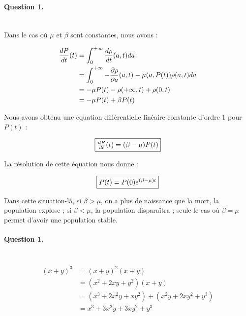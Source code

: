 \documentclass[paper=a4, french]{scrartcl} %
\numberwithin{equation}{section} %
\numberwithin{figure}{section} %
\numberwithin{table}{section} %
\begin{document}

\paragraph{\textbf{Question 1.}}
~\\

Dans le cas où $\mu$ et $\beta$ sont constantes, nous avons :

\begin{equation*}
\begin{aligned}
{dP \over dt}(t)  & =  {\int_{0}^{+\infty}{d\rho \over dt}(a,t)da} \\
& =  {\int_{0}^{+\infty} - \frac{\partial \rho}{\partial a}(a,t) - \mu(a,P(t))\rho(a,t) da} \\
& =  -\mu P(t) - \rho (+ \infty,t) + \rho (0,t) \\
& = -\mu P(t) + \beta P(t) \\
\end{aligned}
\end{equation*}

Nous avons obtenu une équation différentielle linéaire constante d\rq{}ordre 1 pour $P(t)$ :

\begin{equation}
\fbox{${dP \over dt}(t) = (\beta - \mu)P(t)$}
\end{equation}

La résolution de cette équation nous donne :

\begin{equation}
\fbox{$P(t) = P(0) e^{(\beta - \mu)t}$}
\end{equation}

Dans cette situation-là, si $\beta > \mu$, on a plus de naissance que la mort, la population explose ; si $\beta < \mu$, la population disparaîtra ; seule le cas où $\beta = \mu$ permet d\rq{}avoir une population stable.


\paragraph{\textbf{Question 1.}}
~\\



\begin{align} 
\begin{split}
(x+y)^3 	&= (x+y)^2(x+y)\\
&=(x^2+2xy+y^2)(x+y)\\
&=(x^3+2x^2y+xy^2) + (x^2y+2xy^2+y^3)\\
&=x^3+3x^2y+3xy^2+y^3
\end{split}					
\end{align}
\end{document}
